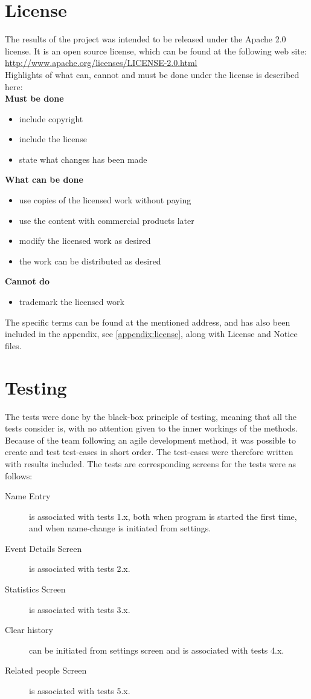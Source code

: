\section{License}
The results of the project was intended to be released under the Apache 2.0 license. It is an open source license, which can be found  at the following web site: \url{http://www.apache.org/licenses/LICENSE-2.0.html}\\
Highlights of what can, cannot and must be done under the license is described here:\\
\textbf{Must be done}
\begin{itemize}
\item include copyright
\item include the license
\item state what changes has been made
\end{itemize}
\textbf{What can be done}
\begin{itemize}
\item use copies of the licensed work without paying
\item use the content with commercial products later
\item modify the licensed work as desired
\item the work can be distributed as desired
\end{itemize}
\textbf{Cannot do}
\begin{itemize}
\item trademark the licensed work
\end{itemize}
The specific terms can be found at the mentioned address, and has also been included in the appendix, see \ref{appendix:license}, along with License and Notice files.

\section{Testing}
The tests were done by the black-box principle of testing, meaning that all the tests consider is, with no attention given to the inner workings of the methods. Because of the team following an agile development method, it was possible to create and test test-cases in short order. The test-cases were therefore written with results included.
The tests are corresponding screens for the tests were as follows:
\begin{description}
\item[Name Entry] is associated with tests 1.x, both when program is started the first time, and when name-change is initiated from settings.
\item[Event Details Screen] is associated with tests 2.x.
\item[Statistics Screen] is associated with tests 3.x.
\item[Clear history] can be initiated from settings screen and is associated with tests 4.x.
\item[Related people Screen] is associated with tests 5.x. 
\end{description}

